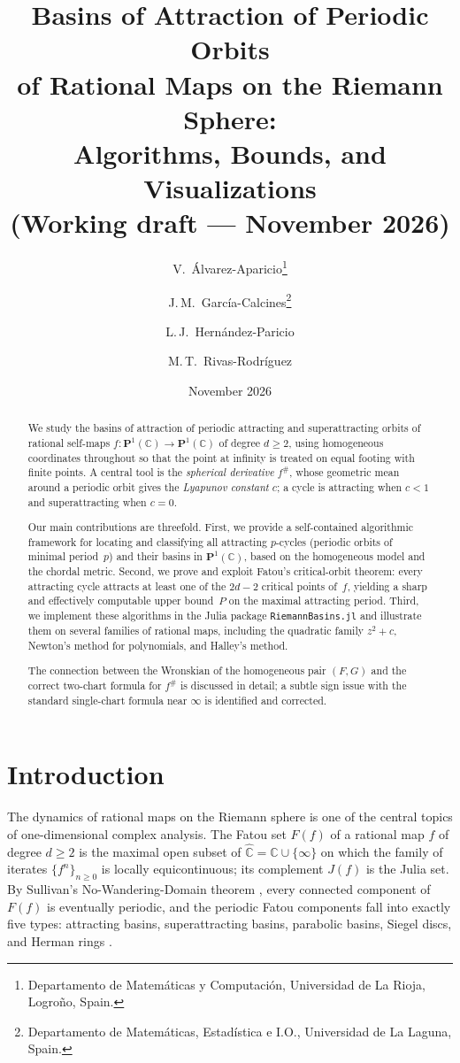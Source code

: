 \documentclass[12pt]{article}
\title{\textbf{Basins of Attraction of Periodic Orbits\\
        of Rational Maps on the Riemann Sphere:\\
        Algorithms, Bounds, and Visualizations}\\[6pt]
       {\large (Working draft --- November 2026)}}
\author{V.~\'Alvarez-Aparicio\thanks{Departamento de Matem\'aticas y
Computaci\'on, Universidad de La Rioja, Logro\~no, Spain.} \and
J.\,M.~Garc\'ia-Calcines\thanks{Departamento de Matem\'aticas,
Estad\'istica e I.O., Universidad de La Laguna, Spain.} \and
L.\,J.~Hern\'andez-Paricio\footnotemark[1] \and
M.\,T.~Rivas-Rodr\'iguez\footnotemark[1]}
\date{November 2026}
\theoremstyle{definition}
\newcommand{\C}{\mathbb{C}}
\newcommand{\Chat}{\hat{\C}}
\newcommand{\Pone}{\mathbf{P}^1(\C)}
\newcommand{\fsh}{f^{\#}}
\newcommand{\Ff}{F(f)}
\newcommand{\Jf}{J(f)}
\begin{document}
\maketitle

\begin{abstract}
We study the basins of attraction of periodic attracting and superattracting
orbits of rational self-maps $f\colon\Pone\to\Pone$ of degree $d\geq 2$,
using homogeneous coordinates throughout so that the point at infinity is
treated on equal footing with finite points.  A central tool is the
\emph{spherical derivative} $\fsh$, whose geometric mean around a periodic
orbit gives the \emph{Lyapunov constant} $c$; a cycle is attracting when
$c<1$ and superattracting when $c=0$.

Our main contributions are threefold.  First, we provide a self-contained
algorithmic framework for locating and classifying all attracting $p$-cycles
(periodic orbits of minimal period~$p$) and their basins in $\Pone$, based
on the homogeneous model and the chordal metric.  Second, we prove and exploit
Fatou's critical-orbit theorem: every attracting cycle attracts at least one
of the $2d-2$ critical points of~$f$, yielding a sharp and effectively
computable upper bound~$P$ on the maximal attracting period.  Third, we
implement these algorithms in the Julia package \texttt{RiemannBasins.jl}
and illustrate them on several families of rational maps, including the
quadratic family $z^2+c$, Newton's method for polynomials, and Halley's
method.

The connection between the Wronskian of the homogeneous pair $(F,G)$ and the
correct two-chart formula for $\fsh$ is discussed in detail; a subtle sign
issue with the standard single-chart formula near $\infty$ is identified and
corrected.
\end{abstract}

\tableofcontents

\section{Introduction}
\label{sec:intro}

The dynamics of rational maps on the Riemann sphere is one of the central
topics of one-dimensional complex analysis.  The Fatou set $\Ff$ of a
rational map $f$ of degree $d\geq 2$ is the maximal open subset of
$\Chat = \C\cup\{\infty\}$ on which the family of iterates
$\{f^n\}_{n\geq 0}$ is locally equicontinuous; its complement $\Jf$ is
the Julia set.  By Sullivan's No-Wandering-Domain theorem \cite{Sullivan1985},
every connected component of $\Ff$ is eventually periodic, and the periodic
Fatou components fall into exactly five types: attracting basins,
superattracting basins, parabolic basins, Siegel discs, and Herman rings
\cite{Milnor2006}.
\end{document}
